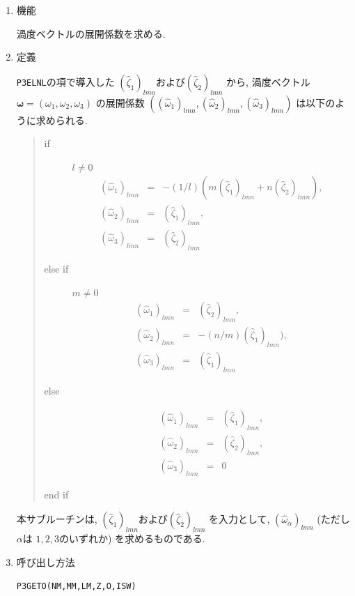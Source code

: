 \documentclass[a4j,fleqn]{jarticle}
\begin{document}
\begin{enumerate}

\item 機能

渦度ベクトルの展開係数を求める.

\item 定義

{\tt P3ELNL}の項で導入した
$(\hat{\zeta}_1)_{lmn}$および$(\hat{\zeta}_2)_{lmn}$
から, 渦度ベクトル$\boldsymbol{\omega}=(\omega_1,\omega_2,\omega_3)$
の展開係数
$((\hat{\omega}_1)_{lmn},(\hat{\omega}_2)_{lmn},(\hat{\omega}_3)_{lmn})$
は以下のように求められる.
\begin{quote}
\begin{description}
\item[if] $l\neq 0$
\begin{eqnarray*}
(\hat{\omega}_1)_{lmn}&=&-(1/l)(m(\hat{\zeta}_1)_{lmn}+n(\hat{\zeta}_2)_{lmn}),\\
(\hat{\omega}_2)_{lmn}&=&(\hat{\zeta}_1)_{lmn},\\
(\hat{\omega}_3)_{lmn}&=&(\hat{\zeta}_2)_{lmn}
\end{eqnarray*}
\item[else if] $m\neq 0$
\begin{eqnarray*}
(\hat{\omega}_1)_{lmn}&=&(\hat{\zeta}_2)_{lmn},\\
(\hat{\omega}_2)_{lmn}&=&-(n/m)(\hat{\zeta}_1)_{lmn}),\\
(\hat{\omega}_3)_{lmn}&=&(\hat{\zeta}_1)_{lmn}
\end{eqnarray*}
\item[else]
\begin{eqnarray*}
(\hat{\omega}_1)_{lmn}&=&(\hat{\zeta}_1)_{lmn},\\
(\hat{\omega}_2)_{lmn}&=&(\hat{\zeta}_2)_{lmn},\\
(\hat{\omega}_3)_{lmn}&=&0
\end{eqnarray*}

\item[end if]

\end{description}
\end{quote}

本サブルーチンは,
$(\hat{\zeta}_1)_{lmn}$および$(\hat{\zeta}_2)_{lmn}$
を入力として, $(\hat{\omega}_{\alpha})_{lmn}$ 
(ただし$\alpha$は $1,2,3$のいずれか)
を求めるものである.

\item 呼び出し方法

{\tt P3GETO(NM,MM,LM,Z,O,ISW)}
  

\end{enumerate}
\end{document}
